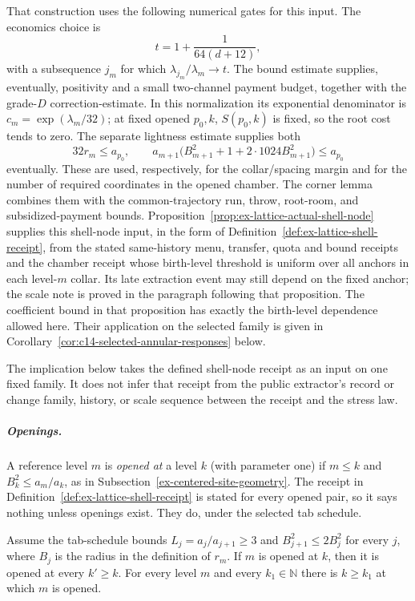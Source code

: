 That construction uses the following numerical gates for this input. The
economics choice is
\[
  t=1+\frac{1}{64(d+12)},
\]
with a subsequence $j_m$ for which $\lambda_{j_m}/\lambda_m\to t$.  The bound
estimate supplies, eventually, positivity and a small two-channel payment
budget, together with the grade-$D$ correction-estimate. In this
normalization its exponential denominator is $c_m=\exp(\lambda_m/32)$; at fixed
opened $p_0,k$, $S(p_0,k)$ is fixed, so the root cost tends to zero.  The separate
lightness estimate supplies both
\[
  32r_m\leq a_{p_0},\qquad
  a_{m+1}\bigl(B_{m+1}^2+1+2\cdot1024 B_{m+1}^2\bigr)\leq a_{p_0}
\]
eventually.  These are used, respectively, for the collar/spacing margin and
for the number of required coordinates in the opened chamber.  The corner
lemma combines them with the common-trajectory run, throw, root-room, and
subsidized-payment bounds.  Proposition~\ref{prop:ex-lattice-actual-shell-node} supplies this
shell-node input, in the form of Definition~\ref{def:ex-lattice-shell-receipt},
from the stated same-history menu, transfer, quota and bound receipts and
the chamber receipt whose birth-level threshold is uniform over all
anchors in each level-$m$ collar. Its late extraction event may still
depend on the fixed anchor; the scale note is proved in the paragraph
following that proposition. The coefficient bound in that proposition has exactly
the birth-level dependence allowed here. Their application on the selected family is given in
Corollary~\ref{cor:c14-selected-annular-responses} below.

The implication below takes the defined shell-node receipt as an input
on one fixed family.  It does not infer that receipt from the public
extractor's record or change family, history, or scale sequence between the
receipt and the stress law.

\subparagraph{Openings.}
A reference level $m$ is \emph{opened at} a level $k$ (with parameter one)
if $m\le k$ and $B_k^2\le a_m/a_k$, as in
Subsection~\ref{ex-centered-site-geometry}.  The receipt in
Definition~\ref{def:ex-lattice-shell-receipt} is stated for every opened
pair, so it says nothing unless openings exist.  They do, under the
selected tab schedule.

\begin{lemma}
\label{lem:ex-lattice-opening-exists}
Assume the tab-schedule bounds $L_j=a_j/a_{j+1}\ge3$ and
$B_{j+1}^2\le2B_j^2$ for every $j$, where $B_j$ is the radius in the
definition of $r_m$.  If $m$ is opened at $k$, then it is opened at every
$k'\ge k$.  For every level $m$ and every $k_1\in\mathbb N$ there is
$k\ge k_1$ at which $m$ is opened.
\end{lemma}

